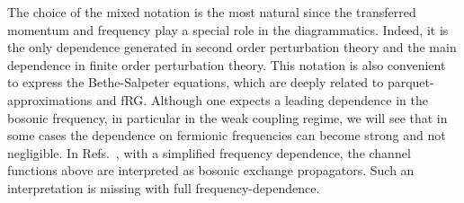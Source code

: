  The choice of the mixed notation is the most natural since the transferred momentum and 
frequency play a special role in the diagrammatics.
Indeed, it is the only dependence generated in second order perturbation theory and the main dependence in finite 
order perturbation theory. This notation is also convenient to express the Bethe-Salpeter equations, which are deeply related to parquet-approximations and fRG.
Although one expects a leading dependence in the bosonic frequency, 
in particular in the weak coupling regime, we will see that in some cases the dependence on fermionic frequencies can become strong and not negligible.
In Refs.~, with a simplified frequency dependence, the channel functions above are interpreted as bosonic exchange propagators. Such an interpretation is missing with full frequency-dependence.

